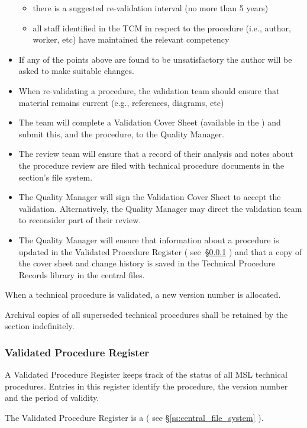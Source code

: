 \begin{itemize}
\begin{itemize}
\item there is a suggested re-validation interval (no more than 5 years)
\item all staff identified in the TCM in respect to the procedure (i.e., author, worker, etc) have maintained the relevant competency
\end{itemize}
\item If any of the points above are found to be unsatisfactory the author will be asked to make suitable changes.
\item When re-validating a procedure, the validation team should ensure that material remains current (e.g., references, diagrams, etc)
\item The team will complete a Validation Cover Sheet (available in the ) and submit this, and the procedure, to the Quality Manager. 
\item The review team will ensure that a record of their analysis and notes about the procedure review are filed with technical procedure documents in the section’s file system. 
\item The Quality Manager will sign the Validation Cover Sheet to accept the validation. Alternatively, the Quality Manager may direct the validation team to reconsider part of their review.
\item The Quality Manager will ensure that information about a procedure is updated in the Validated Procedure Register ( see~\S\ref{sss:validated_procedure_register} ) and that a copy of the cover sheet and change history is saved in the Technical Procedure Records library in the central files.
\end{itemize}

When a technical procedure is validated, a new version number is allocated. 

Archival copies of all superseded technical procedures shall be retained by the section indefinitely.

\subsubsection{Validated Procedure Register}
\label{sss:validated_procedure_register}
A Validated Procedure Register keeps track of the status of all MSL technical procedures. Entries in this register identify the procedure, the version number and the period of validity.

The Validated Procedure Register is a  ( see \S\ref{ss:central_file_system} ). 

